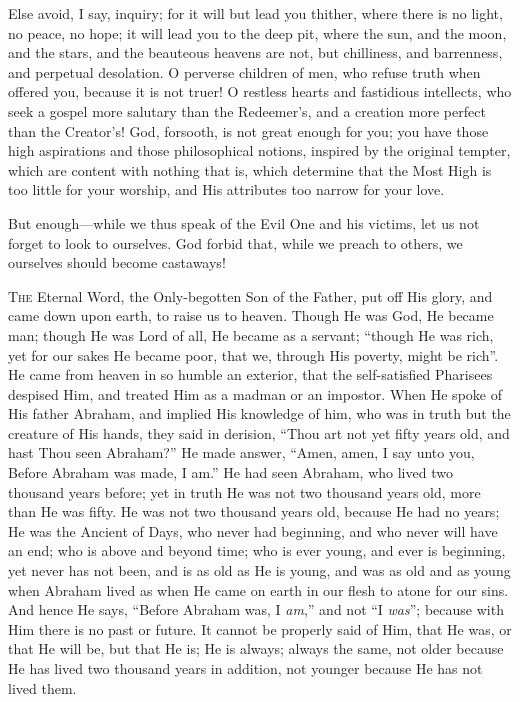 Else avoid, I say, inquiry; for it will but lead you thither, where
there is no light, no peace, no hope; it will lead you to the deep
pit, where the sun, and the moon, and the stars, and the beauteous
heavens are not, but chilliness, and barrenness, and perpetual
desolation. O perverse children of men, who refuse truth when offered
you, because it is not truer! O restless hearts and fastidious
intellects, who seek a gospel more salutary than the Redeemer's, and a
creation more perfect than the Creator's! God, forsooth, is not great
enough for you; you have those high aspirations and those
philosophical notions, inspired by the original tempter, which are
content with nothing that is, which determine that the Most High is
too little for your worship, and His attributes too narrow for your
love.

But enough—while we thus speak of the Evil One and his victims,
let us not forget to look to ourselves. God forbid that, while we
preach to others, we ourselves should become castaways!


T\textsc{he} Eternal Word, the Only-begotten Son of the Father, put off His
glory, and came down upon earth, to raise us to heaven. Though He was
God, He became man; though He was Lord of all, He became as a servant;
``though He was rich, yet for our sakes He became poor, that we,
through His poverty, might be rich''. He came from heaven in so
humble an exterior, that the self-satisfied Pharisees despised Him,
and treated Him as a madman or an impostor. When He spoke of His
father Abraham, and implied His knowledge of him, who was in truth but
the creature of His hands, they said in derision, ``Thou art not
yet fifty years old, and hast Thou seen Abraham?'' He made answer,
``Amen, amen, I say unto you, Before Abraham was made, I am.''
He had seen Abraham, who lived two thousand years before; yet in truth
He was not two thousand years old, more than He was fifty. He was not
two thousand years old, because He had no years; He was the Ancient of
Days, who never had beginning, and who never will have an end; who is
above and beyond time; who is ever young, and ever is beginning, yet
never has not been, and is as old as He is young, and was as old and
as young when Abraham lived as when He came on earth in our flesh to
atone for our sins. And hence He says, ``Before Abraham was, I \emph{am},''
and not ``I \emph{was}''; because with Him there is no past or
future. It cannot be properly said of Him, that He was, or that He
will be, but that He is; He is always; always the same, not older
because He has lived two thousand years in addition, not younger
because He has not lived them.

